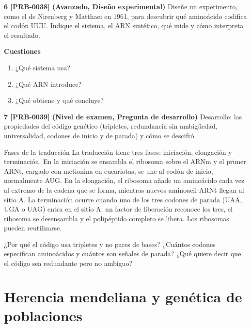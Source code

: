 \documentclass{book}
\begin{document}
\begin{tcolorbox}[title={Ejercicios}, studiumworked, breakable]
\noindent\textbf{6 [PRB-0038] (Avanzado, Diseño experimental)}
Diseñe un experimento, como el de Nirenberg y Matthaei en 1961, para descubrir qué aminoácido codifica el codón UUU. Indique el sistema, el ARN sintético, qué mide y cómo interpreta el resultado.


\noindent\textbf{Cuestiones}
\begin{enumerate}
\item ¿Qué sistema usa?
\item ¿Qué ARN introduce?
\item ¿Qué obtiene y qué concluye?
\end{enumerate}

\noindent\textbf{7 [PRB-0039] (Nivel de examen, Pregunta de desarrollo)}
Desarrolle: las propiedades del código genético (tripletes, redundancia sin ambigüedad, universalidad, codones de inicio y de parada) y cómo se descifró.

\end{tcolorbox}

\begin{tcolorbox}[title={Autoficha}, studiumcheck, breakable]

Fases de la traducción
La traducción tiene tres fases: iniciación, elongación y terminación. En la iniciación se ensambla el ribosoma sobre el ARNm y el primer ARNt, cargado con metionina en eucariotas, se une al codón de inicio, normalmente AUG. En la elongación, el ribosoma añade un aminoácido cada vez al extremo de la cadena que se forma, mientras nuevos aminoacil-ARNt llegan al sitio A. La terminación ocurre cuando uno de los tres codones de parada (UAA, UGA o UAG) entra en el sitio A: un factor de liberación reconoce los tres, el ribosoma se desensambla y el polipéptido completo se libera. Los ribosomas pueden reutilizarse.


¿Por qué el código usa tripletes y no pares de bases? ¿Cuántos codones especifican aminoácidos y cuántos son señales de parada? ¿Qué quiere decir que el código sea redundante pero no ambiguo?

\end{tcolorbox}

\chapter{Herencia mendeliana y genética de poblaciones}
\label{chap:bio-06}
\end{document}
